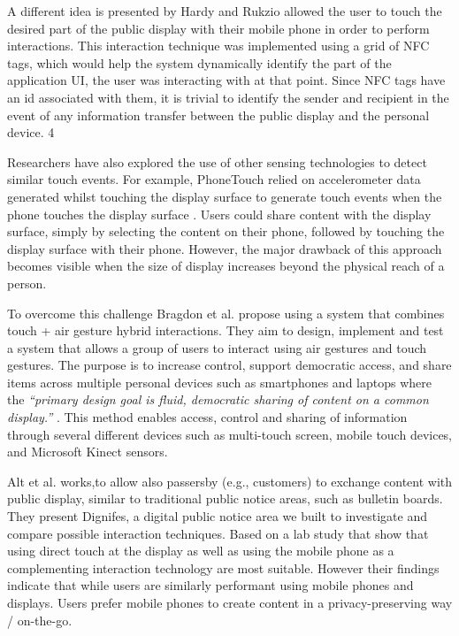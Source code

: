  A different idea is presented by Hardy and Rukzio \cite{Hardy:2008} allowed the user to touch the desired part of the public display with their mobile phone in order to perform interactions. This interaction technique was implemented using a grid of NFC tags, which would help the system dynamically identify the part of the application UI, the user was interacting with at that point. Since NFC tags have an id associated with them, it is trivial to identify the sender and recipient in the event of any information transfer between the public display and the personal device.  4
 
 Researchers have also explored the use of other sensing technologies to detect similar touch events. For example, PhoneTouch relied on accelerometer data generated whilst touching the display surface to generate touch events when the phone touches the display surface \cite{Schmidt:2012}. Users could share content with the display surface, simply by selecting the content on their phone, followed by touching the display surface with their phone. However, the major drawback of this approach becomes visible when the size of display increases beyond the physical reach of a person.
 
 To overcome this challenge Bragdon et al. propose using a system that combines touch + air gesture hybrid interactions. They aim to design, implement and test a system that allows a group of users to interact using air gestures and touch gestures. The purpose is to increase control, support democratic access, and share items across multiple personal devices such as smartphones and laptops where the {\em``primary design goal is fluid, democratic sharing of content on a common display.''} \cite{Bragton:2011}. This method enables access, control and sharing of information through several different devices such as multi-touch screen, mobile touch devices, and Microsoft Kinect sensors.
 
 Alt et al. \cite{Alt:2013} works,to allow also passersby (e.g., customers) to exchange content with public display, similar to traditional public notice areas, such as bulletin boards. They present Dignifes, a digital public notice area we built to investigate and compare possible interaction techniques. Based on a lab study that show that using direct touch at the display as well as using the mobile phone as a complementing interaction technology are most suitable. However their findings indicate that while users are similarly performant using mobile phones and displays. Users prefer mobile phones to create content in a privacy-preserving way / on-the-go.